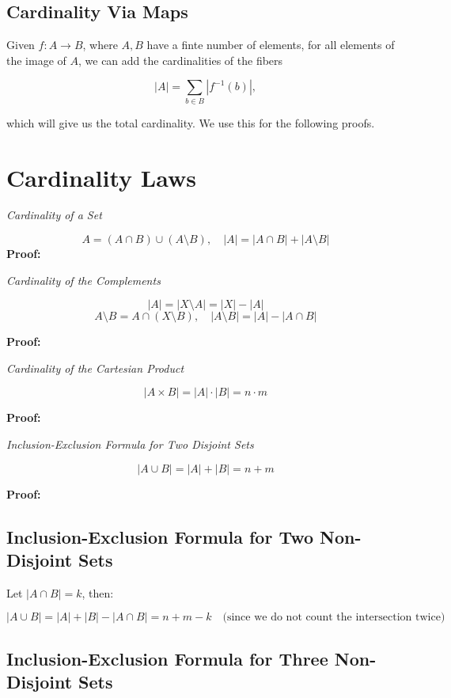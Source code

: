 \subsection{Cardinality Via Maps}

Given \(f: A \to B\), where \(A,B\) have a finte number of elements, for all elements of the image of \(A\), we can add the cardinalities of
the fibers

\[
	|A| = \sum_{b \in B} |f^{-1}(b)|,
\]

which will give us the total cardinality. We use this for the following proofs.

\section{Cardinality Laws}

\emph{Cardinality of a Set}

\[
	A = (A \cap B) \cup (A \setminus B), \quad |A| = |A \cap B| + |A \setminus B|
\]
\textbf{Proof:}

\emph{Cardinality of the Complements}

\[
	|A| = |X \setminus A| = |X| - |A|
\]
\[
	A \setminus B = A \cap (X \setminus B), \quad |A \setminus B| = |A| - |A \cap B|
\]

\textbf{Proof:}

\emph{Cardinality of the Cartesian Product}

\[
	|A \times B| = |A| \cdot |B| = n \cdot m
\]

\textbf{Proof:}

\emph{Inclusion-Exclusion Formula for Two Disjoint Sets}

\[
	|A \cup B| = |A| + |B| = n + m
\]

\textbf{Proof:}

\subsection{Inclusion-Exclusion Formula for Two Non-Disjoint Sets}

Let \( |A \cap B| = k \), then:

\[
	|A \cup B| = |A| + |B| - |A \cap B| = n + m - k \quad \text{(since we do not count the intersection
		twice)}
\]

\subsection{Inclusion-Exclusion Formula for Three Non-Disjoint Sets}

